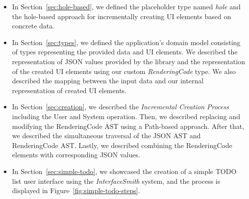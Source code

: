 \begin{itemize}
	\item In Section~\ref{sec:hole-based}, we defined the placeholder type named \emph{hole} and the hole-based approach for incrementally creating UI elements based on concrete data.
	\item In Section~\ref{sec:types}, we defined the application's domain model consisting of types representing the provided data and UI elements.
	      We described the representation of JSON values provided by the \citet{simpleJson} library and the representation of the created UI elements using our custom \emph{RenderingCode} type.
	      We also described the mapping between the input data and our internal representation of created UI elements.

	\item In Section~\ref{sec:creation}, we described the \emph{Incremental Creation Process} including the User and System operation.
	      Then, we described replacing and modifying the RenderingCode AST using a Path-based approach.
	      After that, we described the simultaneous traversal of the JSON AST and RenderingCode AST.
	      Lastly, we described combining the RenderingCode elements with corresponding JSON values.
	\item In Section~\ref{sec:simple-todo}, we showcased the creation of a simple TODO list user interface using the \emph{InterfaceSmith} system, and the process is displayed in Figure~\ref{fig:simple-todo-steps}.
\end{itemize}

